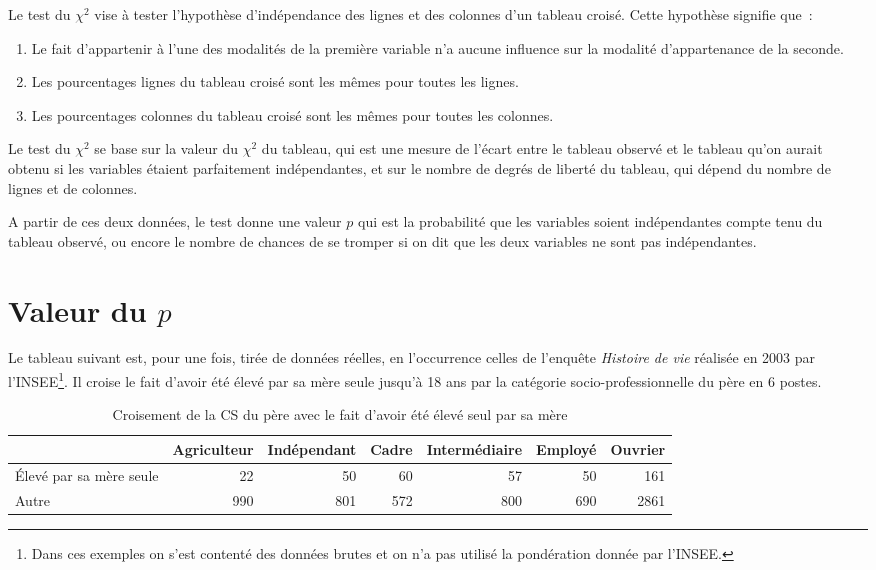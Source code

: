 \documentclass[a4paper,10pt,twoside,francais]{report}
\newcommand{\chid}{$\chi^2$\xspace}
\begin{document}
Le test du \chid vise à tester l'hypothèse d'indépendance des lignes
et des colonnes d'un tableau croisé. Cette hypothèse signifie que~:
\begin{enumerate}
\item Le fait d'appartenir à l'une des modalités de la première
  variable n'a aucune influence sur la modalité d'appartenance de la
  seconde.
\item Les pourcentages lignes du tableau croisé sont les mêmes pour
  toutes les lignes.
\item Les pourcentages colonnes du tableau croisé sont les mêmes pour
  toutes les colonnes.
\end{enumerate}

Le test du \chid se base sur la valeur du \chid du tableau, qui est
une mesure de l'écart entre le tableau observé et le tableau qu'on
aurait obtenu si les variables étaient parfaitement indépendantes, et
sur le nombre de degrés de liberté du tableau, qui dépend du nombre de
lignes et de colonnes.

A partir de ces deux données, le test donne une valeur $p$ qui est la
probabilité que les variables soient indépendantes compte tenu du
tableau observé, ou encore le nombre de chances de se tromper si on
dit que les deux variables ne sont pas indépendantes.


\section{Valeur du \texorpdfstring{$p$}{p}}
\label{ssec-valp}


Le tableau suivant est, pour une fois, tirée de données réelles, en
l'occurrence celles de l'enquête \textit{Histoire de vie} réalisée en
2003 par l'INSEE\footnote{Dans ces exemples on s'est contenté des
  données brutes et on n'a pas utilisé la pondération donnée par
  l'INSEE.}. Il croise le fait d'avoir été élevé par sa mère seule
jusqu'à 18 ans par la catégorie socio-professionnelle du père en 6
postes.


\begin{table}[H]
  \begin{center}
    \small
    \begin{tabular}[!h]{lrrrrrr}
      \toprule
      & Agriculteur & Indépendant & Cadre & Intermédiaire & Employé & Ouvrier\\
      \midrule
      Élevé par sa mère seule & 22 & 50 & 60 & 57 & 50 & 161 \\
      Autre & 990 & 801 & 572 & 800 & 690 & 2861 \\
      \bottomrule
    \end{tabular}
  \end{center}
  \caption{Croisement de la CS du père avec le fait d'avoir été élevé
    seul par sa mère}
  \label{cselev}
  \normalsize
\end{table}
\end{document}
